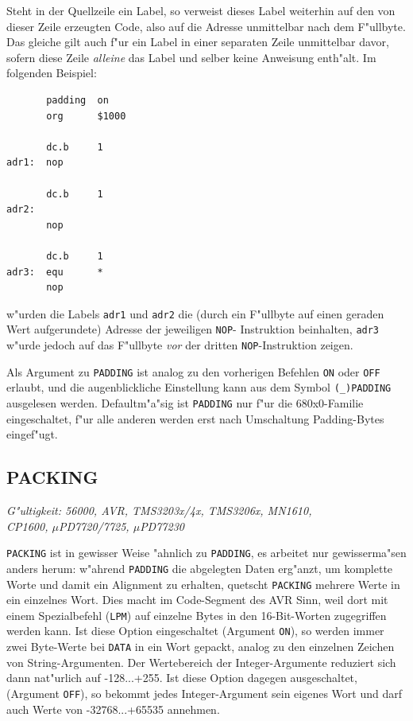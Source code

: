 \documentclass[12pt,a4paper,twoside]{report}
\makeatletter
\newcommand{\tty}[1]{{\tt #1}}
\newcommand{\ttindex}[1]{\index{#1@{\tt #1}}}
\newcommand{\predefsym}[1]{{\tt (\_)#1}}
\makeatother
\begin{document}
Steht in der Quellzeile ein Label, so verweist dieses Label weiterhin
auf den von dieser Zeile erzeugten Code, also auf die Adresse unmittelbar
nach dem F"ullbyte.  Das gleiche gilt auch f"ur ein Label in einer
separaten Zeile unmittelbar davor, sofern diese Zeile {\em alleine} das
Label und selber keine Anweisung enth"alt.  Im folgenden Beispiel:
\begin{verbatim}
       padding  on
       org      $1000

       dc.b     1
adr1:  nop

       dc.b     1
adr2:
       nop

       dc.b     1
adr3:  equ      *
       nop
\end{verbatim}
w"urden die Labels \tty{adr1} und \tty{adr2} die (durch ein F"ullbyte
auf einen geraden Wert aufgerundete) Adresse der jeweiligen \tty{NOP}-
Instruktion beinhalten, \tty{adr3} w"urde jedoch auf das F"ullbyte {\em vor}
der dritten \tty{NOP}-Instruktion zeigen.

Als Argument zu \tty{PADDING} ist analog zu den vorherigen Befehlen
\tty{ON} oder \tty{OFF} erlaubt, und die augenblickliche Einstellung
kann aus dem Symbol \predefsym{PADDING} ausgelesen werden. Defaultm"a"sig
ist \tty{PADDING} nur f"ur die 680x0-Familie eingeschaltet, f"ur alle
anderen werden erst nach Umschaltung Padding-Bytes eingef"ugt.


\subsection{PACKING}
\ttindex{PACKING}\label{SectPACKING}

{\em G"ultigkeit: 56000, AVR, TMS3203x/4x, TMS3206x, MN1610, \\
     CP1600, $\mu$PD7720/7725, $\mu$PD77230}

{\tt PACKING} ist in gewisser Weise "ahnlich zu {\tt PADDING}, es arbeitet
nur gewisserma"sen anders herum: w"ahrend {\tt PADDING} die
abgelegten Daten erg"anzt, um komplette Worte und damit ein Alignment zu
erhalten, quetscht {\tt PACKING} mehrere Werte in ein einzelnes Wort.
Dies macht im Code-Segment des AVR Sinn, weil dort mit einem Spezialbefehl
({\tt LPM}) auf einzelne Bytes in den 16-Bit-Worten zugegriffen werden
kann.  Ist diese Option eingeschaltet (Argument {\tt ON}), so werden immer
zwei Byte-Werte bei {\tt DATA} in ein Wort gepackt, analog zu den
einzelnen Zeichen von String-Argumenten.  Der Wertebereich der
Integer-Argumente reduziert sich dann nat"urlich auf -128...+255.  Ist
diese Option dagegen ausgeschaltet, (Argument {\tt OFF}), so bekommt
jedes Integer-Argument sein eigenes Wort und darf auch Werte von
-32768...+65535 annehmen.
\end{document}
